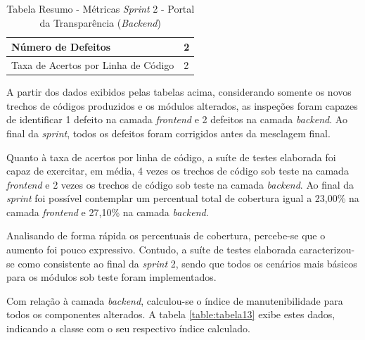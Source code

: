 \begin{table}[h]
\caption{Tabela Resumo - Métricas \textit{Sprint} 2 - Portal da Transparência (\textit{Backend})}
\centering
\begin{tabular}{ | m{8cm} | m{8cm} | } 
\hline
Número de Defeitos & 2 \\ 
\hline
Taxa de Acertos por Linha de Código & 2 \\ 
\hline
\end{tabular}
\label{table:tabela12}
\end{table}

A partir dos dados exibidos pelas tabelas acima, considerando somente os novos trechos de códigos produzidos e os módulos alterados, as inspeções foram capazes de identificar 1 defeito na camada \textit{frontend} e 2 defeitos na camada \textit{backend}. Ao final da \textit{sprint}, todos os defeitos foram corrigidos antes da mesclagem final.

Quanto à taxa de acertos por linha de código, a suíte de testes elaborada foi capaz de exercitar, em média, 4 vezes os trechos de código sob teste na camada \textit{frontend} e 2 vezes os trechos de código sob teste na camada \textit{backend}. Ao final da \textit{sprint} foi possível contemplar um percentual total de cobertura igual a 23,00\% na camada \textit{frontend} e 27,10\% na camada \textit{backend}.

Analisando de forma rápida os percentuais de cobertura, percebe-se que o aumento foi pouco expressivo. Contudo, a suíte de testes elaborada caracterizou-se como consistente ao final da \textit{sprint} 2, sendo que todos os cenários mais básicos para os módulos sob teste foram implementados.

Com relação à camada \textit{backend}, calculou-se o índice de manutenibilidade para todos os componentes alterados. A tabela \ref{table:tabela13} exibe estes dados, indicando a classe com o seu respectivo índice calculado.


